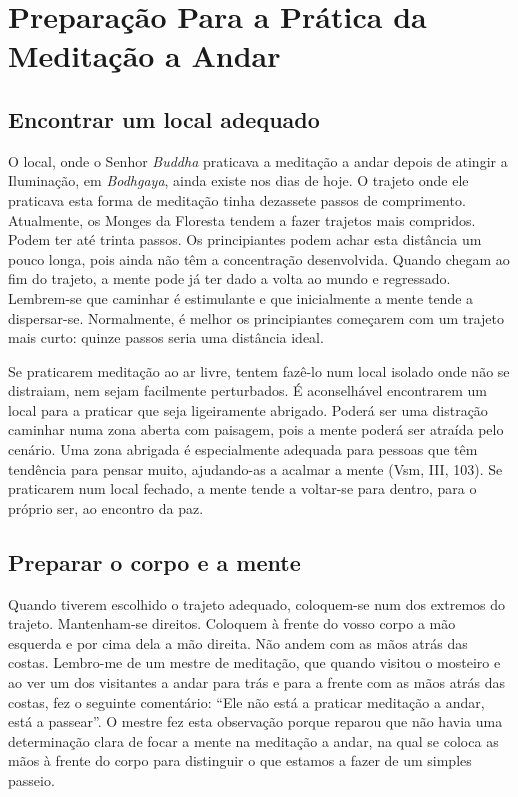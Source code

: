 \chapter{Preparação Para a Prática da Meditação a Andar}

\section{Encontrar um local adequado}

O local, onde o Senhor \emph{Buddha} praticava a meditação a andar depois de
atingir a Iluminação, em \emph{Bodhgaya}, ainda existe nos dias de hoje. O
trajeto onde ele praticava esta forma de meditação tinha dezassete passos de
comprimento. Atualmente, os Monges da Floresta tendem a fazer trajetos mais
compridos. Podem ter até trinta passos. Os principiantes podem achar esta
distância um pouco longa, pois ainda não têm a concentração desenvolvida. Quando
chegam ao fim do trajeto, a mente pode já ter dado a volta ao mundo e
regressado. Lembrem-se que caminhar é estimulante e que inicialmente a mente
tende a dispersar-se. Normalmente, é melhor os principiantes começarem com um
trajeto mais curto: quinze passos seria uma distância ideal.

Se praticarem meditação ao ar livre, tentem fazê-lo num local isolado
onde não se distraiam, nem sejam facilmente perturbados. É aconselhável
encontrarem um local para a praticar que seja ligeiramente abrigado.
Poderá ser uma distração caminhar numa zona aberta com paisagem, pois a
mente poderá ser atraída pelo cenário. Uma zona abrigada é especialmente
adequada para pessoas que têm tendência para pensar muito, ajudando-as a
acalmar a mente (Vsm, III, 103). Se praticarem num local fechado, a
mente tende a voltar-se para dentro, para o próprio ser, ao encontro da
paz.

\section{Preparar o corpo e a mente}

Quando tiverem escolhido o trajeto adequado, coloquem-se num dos
extremos do trajeto. Mantenham-se direitos. Coloquem à frente do vosso
corpo a mão esquerda e por cima dela a mão direita. Não andem com as
mãos atrás das costas. Lembro-me de um mestre de meditação, que quando
visitou o mosteiro e ao ver um dos visitantes a andar para trás e para a
frente com as mãos atrás das costas, fez o seguinte comentário: ``Ele
não está a praticar meditação a andar, está a passear''. O mestre fez
esta observação porque reparou que não havia uma determinação clara de
focar a mente na meditação a andar, na qual se coloca as mãos à frente
do corpo para distinguir o que estamos a fazer de um simples passeio.

